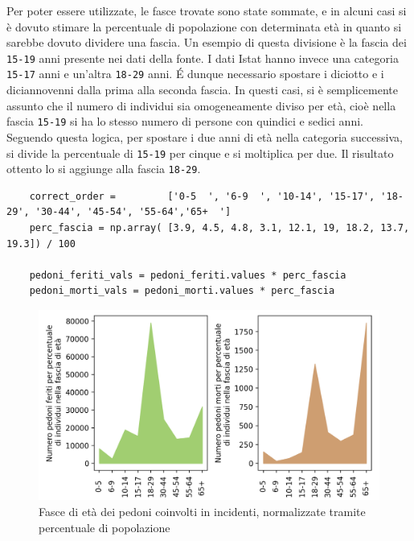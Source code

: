 \documentclass[a4paper]{report}
\newcommand{\columnstyle}[1]{\texttt{#1}}
\begin{document}
Per poter essere utilizzate, le fasce trovate sono state sommate, e in alcuni casi 
si è dovuto stimare la percentuale di popolazione con determinata età in 
quanto si sarebbe dovuto dividere una fascia.
Un esempio di questa divisione è la fascia dei \columnstyle{15-19} anni presente nei 
dati della fonte. 
I dati Istat hanno invece una categoria \columnstyle{15-17} anni e un'altra 
\columnstyle{18-29} anni. 
\'E dunque necessario spostare i diciotto e i diciannovenni dalla prima alla 
seconda fascia. 
In questi casi, si è semplicemente assunto che il numero di individui sia omogeneamente 
diviso per età, cioè nella fascia \columnstyle{15-19} si ha lo stesso numero di 
persone con quindici e sedici anni.
Seguendo questa logica, per spostare i due anni di età nella categoria successiva, 
si divide la percentuale di \columnstyle{15-19} per cinque e si moltiplica per due. 
Il risultato ottento lo si aggiunge alla fascia \columnstyle{18-29}.

\begin{lstlisting}
    correct_order =         ['0-5  ', '6-9  ', '10-14', '15-17', '18-29', '30-44', '45-54', '55-64','65+  ']
    perc_fascia = np.array( [3.9, 4.5, 4.8, 3.1, 12.1, 19, 18.2, 13.7, 19.3]) / 100

    pedoni_feriti_vals = pedoni_feriti.values * perc_fascia
    pedoni_morti_vals = pedoni_morti.values * perc_fascia
\end{lstlisting}

\begin{figure}
    \includegraphics[width=\linewidth]{../src/incidenti/incidenti_senza_coords/pedoni/eta_pedoni_norm.png}
    \caption{Fasce di età dei pedoni coinvolti in incidenti, normalizzate tramite percentuale di popolazione}
    \label{fig:eta-pedoni-norm}
\end{figure}
\end{document}
